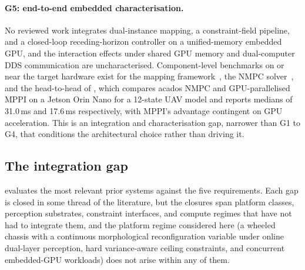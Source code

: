 \documentclass[11pt,a4paper]{article}
\begin{document}
\paragraph{G5: end-to-end embedded characterisation.}
No reviewed work integrates dual-instance mapping, a constraint-field pipeline, and a closed-loop receding-horizon controller on a unified-memory embedded GPU, and the interaction effects under shared GPU memory and dual-computer DDS communication are uncharacterised. Component-level benchmarks on or near the target hardware exist for the mapping framework~\citep{mikiElevationMappingLocomotion2022}, the NMPC solver~\citep{verschueren2022acados}, and the head-to-head of \citet{enrico2025nmpcmppi}, which compares acados NMPC and GPU-parallelised MPPI on a Jetson Orin Nano for a 12-state UAV model and reports medians of 31.0\,ms and 17.6\,ms respectively, with MPPI's advantage contingent on GPU acceleration. This is an integration and characterisation gap, narrower than G1 to G4, that conditions the architectural choice rather than driving it.

\subsection{The integration gap}
\label{sec:synthesis:compounding}

 evaluates the most relevant prior systems against the five requirements. Each gap is closed in some thread of the literature, but the closures span platform classes, perception substrates, constraint interfaces, and compute regimes that have not had to integrate them, and the platform regime considered here (a wheeled chassis with a continuous morphological reconfiguration variable under online dual-layer perception, hard variance-aware ceiling constraints, and concurrent embedded-GPU workloads) does not arise within any of them.
\end{document}
